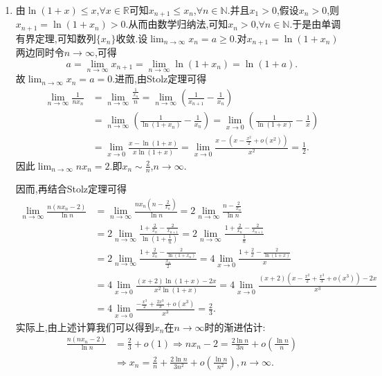 \documentclass[../../main.tex]{subfiles}
\begin{document}
\begin{solution}
\begin{enumerate}
\item 由\(\ln(1 + x) \leqslant  x\),\(\forall x\in\mathbb{R}\)可知\(x_{n + 1} \leqslant  x_n\),\(\forall n\in\mathbb{N}\).并且\(x_1 > 0\),假设\(x_n > 0\),则\(x_{n + 1} = \ln(1 + x_n) > 0\).从而由数学归纳法,可知\(x_n > 0\),\(\forall n\in\mathbb{N}\).于是由单调有界定理,可知数列\(\{x_n\}\)收敛.设\(\lim_{n\rightarrow\infty}x_n = a\geqslant 0\).对\(x_{n + 1} = \ln(1 + x_n)\)两边同时令\(n\rightarrow\infty\),可得
\[
a = \lim_{n\rightarrow\infty}x_{n + 1} = \lim_{n\rightarrow\infty}\ln(1 + x_n) = \ln(1 + a).
\]
故\(\lim_{n\rightarrow\infty}x_n = a = 0\).进而,由Stolz定理可得
\begin{align*}
\lim_{n\rightarrow\infty}\frac{1}{nx_n}&=\lim_{n\rightarrow\infty}\frac{\frac{1}{x_n}}{n}=\lim_{n\rightarrow\infty}\left(\frac{1}{x_{n + 1}} - \frac{1}{x_n}\right)\\
&=\lim_{n\rightarrow\infty}\left(\frac{1}{\ln(1 + x_n)} - \frac{1}{x_n}\right)=\lim_{x\rightarrow0}\left(\frac{1}{\ln(1 + x)} - \frac{1}{x}\right)\\
&=\lim_{x\rightarrow0}\frac{x - \ln(1 + x)}{x\ln(1 + x)}=\lim_{x\rightarrow0}\frac{x - \left(x - \frac{x^2}{2} + o(x^2)\right)}{x^2}=\frac{1}{2}.
\end{align*}
因此\(\lim_{n\rightarrow\infty}nx_n = 2\).即\(x_n\sim\frac{2}{n}\),\(n\rightarrow\infty\).

因而,再结合Stolz定理可得
\begin{align*}
\lim_{n\rightarrow\infty}\frac{n(nx_n - 2)}{\ln n}&=\lim_{n\rightarrow\infty}\frac{nx_n\left(n - \frac{2}{x_n}\right)}{\ln n}=2\lim_{n\rightarrow\infty}\frac{n - \frac{2}{x_n}}{\ln n}\\
&=2\lim_{n\rightarrow\infty}\frac{1 + \frac{2}{x_n} - \frac{2}{x_{n + 1}}}{\ln\left(1 + \frac{1}{n}\right)}=2\lim_{n\rightarrow\infty}\frac{1 + \frac{2}{x_n} - \frac{2}{x_{n + 1}}}{\frac{1}{n}}\\
&=2\lim_{n\rightarrow\infty}\frac{1 + \frac{2}{x_n} - \frac{2}{\ln(1 + x_n)}}{\frac{x_n}{2}}=4\lim_{x\rightarrow0}\frac{1 + \frac{2}{x} - \frac{2}{\ln(1 + x)}}{x}\\
&=4\lim_{x\rightarrow0}\frac{(x + 2)\ln(1 + x) - 2x}{x^2\ln(1 + x)}=4\lim_{x\rightarrow0}\frac{(x + 2)\left(x - \frac{x^2}{2} + \frac{x^3}{3} + o(x^3)\right) - 2x}{x^3}\\
&=4\lim_{x\rightarrow0}\frac{-\frac{x^3}{2} + \frac{2x^3}{3} + o(x^3)}{x^3}=\frac{2}{3}.
\end{align*}
实际上,由上述计算我们可以得到\(x_n\)在\(n\rightarrow\infty\)时的渐进估计:
\begin{align*}
\frac{n(nx_n - 2)}{\ln n}&=\frac{2}{3} + o(1)\Rightarrow nx_n - 2=\frac{2\ln n}{3n} + o\left(\frac{\ln n}{n}\right)\\
&\Rightarrow x_n=\frac{2}{n} + \frac{2\ln n}{3n^2} + o\left(\frac{\ln n}{n^2}\right),n\rightarrow\infty.
\end{align*}


\end{enumerate}
\end{solution}
\end{document}
